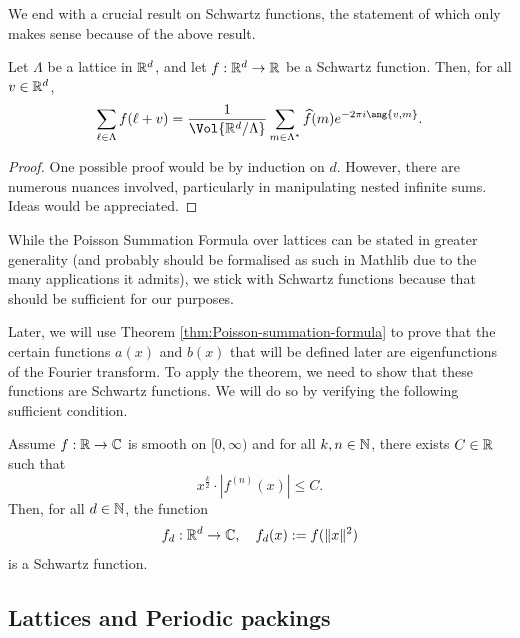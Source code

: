 We end with a crucial result on Schwartz functions, the statement of which only makes sense because of the above result.
\begin{theorem}\label{thm:Poisson-summation-formula}\leanok
  Let $\Lambda$ be a lattice in $\mathbb{R}^d$, and let $f:\mathbb{R}^d\to\mathbb{R}$ be a Schwartz function. Then, for all $v \in \mathbb{R}^d$,
  \[
    \sum_{\ell\in\Lambda}f(\ell + v) = \frac{1}{\Vol{\R^d/\Lambda}} \sum_{m\in\Lambda^*}\widehat{f}(m) e^{-2\pi i \ang{v, m}}.
  \]
\end{theorem}
\begin{proof}
  One possible proof would be by induction on $d$. However, there are numerous nuances involved, particularly in manipulating nested infinite sums. Ideas would be appreciated.
\end{proof}

While the Poisson Summation Formula over lattices can be stated in greater generality (and probably should be formalised as such in Mathlib due to the many applications it admits), we stick with Schwartz functions because that should be sufficient for our purposes.

Later, we will use Theorem \ref{thm:Poisson-summation-formula} to prove that the certain functions $a(x)$ and $b(x)$ that will be defined later are eigenfunctions of the Fourier transform.
To apply the theorem, we need to show that these functions are Schwartz functions. We will do so by verifying the following sufficient condition.

\begin{theorem}\label{thm:smooth-fast-decay-schwartz}
    Assume $f : \mathbb{R} \to \mathbb{C}$ is smooth on $[0, \infty)$ and for all $k, n \in \mathbb{N}$, there exists $C \in \mathbb{R}$ such that
    $$
    x^{\frac{k}{2}} \cdot |f^{(n)}(x)| \leq C.
    $$
    Then, for all $d \in \mathbb{N}$, the function
    $$
    f_d : \mathbb{R}^d \to \mathbb{C}, \quad f_d(x) := f(\|x\|^2)
    $$
    is a Schwartz function.
\end{theorem}


\subsection{Lattices and Periodic packings}

